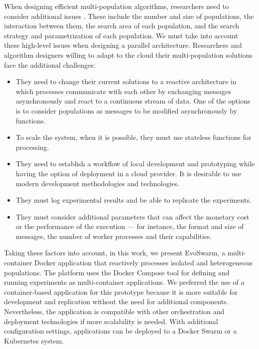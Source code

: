 \documentclass[review]{elsarticle}
\begin{document}
When designing efficient multi-population algorithms, researchers need to
consider additional issues \cite{Ma2019}. These include the number and size of populations,
the interaction between them, the search area of each population, and the search
strategy and parametrization of each population. We must take into account
these high-level issues when designing a parallel architecture. Researchers 
and algorithm designers willing to  adapt to the cloud their
multi-population solutions face the additional challenges:
\begin{itemize}
    \item They need to change their current solutions to a reactive architecture in which processes
    communicate with each other by exchanging messages asynchronously and react
    to a continuous stream of data. One of the options is to consider
    populations as messages to be modified asynchronously by functions. 

    \item To scale the system, when it is possible, they must use stateless functions for
    processing. 

    \item They need to establish a workflow of local development and prototyping while having the 
    option of deployment in a cloud provider. It is desirable to use modern development methodologies and technologies. 

    \item They must log experimental results and be able to replicate the experiments. 

    \item They must consider additional parameters that can affect the monetary cost or the performance of the
    execution — for instance, the format and size of messages, the number of
    worker processes and their capabilities.  
\end{itemize}

Taking these factors into account, in this work, we present EvoSwarm, 
a multi-container Docker application that reactively processes isolated and
heterogeneous populations. The platform uses the Docker Compose tool for
defining and running experiments as multi-container applications. 
We preferred the use of a container-based application for this prototype because
it is more suitable for development and replication without the need for
additional components. Nevertheless, the application is compatible with other
orchestration and deployment technologies if more scalability is needed. 
With additional configuration settings, applications can be deployed 
to a Docker Swarm or a Kubernetes system.  
\end{document}
